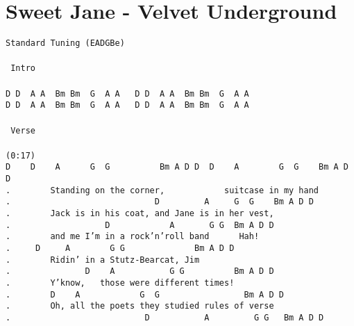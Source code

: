 \newpage
\section{Sweet Jane - Velvet Underground}
\label{Sweet Jane - Velvet Underground}
\texttt{Standard\ Tuning\ (EADGBe)\\
\\
\lbrack\ Intro\rbrack\\
\\
D\ D\ \ A\ A\ \ Bm\ Bm\ \ G\ \ A\ A\ \ \ D\ D\ \ A\ A\ \ Bm\ Bm\ \ G\ \ A\ A\\
D\ D\ \ A\ A\ \ Bm\ Bm\ \ G\ \ A\ A\ \ \ D\ D\ \ A\ A\ \ Bm\ Bm\ \ G\ \ A\ A\\
\\
\lbrack\ Verse\rbrack\\
\\
(0:17)\\
D\ \ \ \ D\ \ \ \ A\ \ \ \ \ \ G\ \ G\ \ \ \ \ \ \ \ \ \ Bm\ A\ D\ D\ \ D\ \ \ \ A\ \ \ \ \ \ \ \ G\ \ G\ \ \ \ Bm\ A\ D\ D\\
.\ \ \ \ \ \ \ \ Standing\ on\ the\ corner,\ \ \ \ \ \ \ \ \ \ \ \ suitcase\ in\ my\ hand\\
.\ \ \ \ \ \ \ \ \ \ \ \ \ \ \ \ \ \ \ \ \ \ \ \ \ \ \ \ \ D\ \ \ \ \ \ \ \ \ A\ \ \ \ \ G\ \ G\ \ \ \ Bm\ A\ D\ D\ \ \ \ \ \\
.\ \ \ \ \ \ \ \ Jack\ is\ in\ his\ coat,\ and\ Jane\ is\ in\ her\ vest,\ \ \ \ \ \ \ \\
.\ \ \ \ \ \ \ \ \ \ \ \ \ \ \ \ \ \ \ D\ \ \ \ \ \ \ \ \ \ \ \ A\ \ \ \ \ \ \ G\ G\ \ Bm\ A\ D\ D\\
.\ \ \ \ \ \ \ \ and\ me\ I'm\ in\ a\ rock'n'roll\ band\ \ \ \ \ \ Hah!\\
.\ \ \ \ \ D\ \ \ \ \ A\ \ \ \ \ \ \ \ G\ G\ \ \ \ \ \ \ \ \ \ \ \ \ \ Bm\ A\ D\ D\ \ \ \ \\
.\ \ \ \ \ \ \ \ Ridin'\ in\ a\ Stutz-Bearcat,\ Jim\\
.\ \ \ \ \ \ \ \ \ \ \ \ \ \ \ D\ \ \ \ A\ \ \ \ \ \ \ \ \ \ \ G\ G\ \ \ \ \ \ \ \ \ \ Bm\ A\ D\ D\\
.\ \ \ \ \ \ \ \ Y'know,\ \ \ those\ were\ different\ times!\\
.\ \ \ \ \ \ \ \ D\ \ \ \ A\ \ \ \ \ \ \ \ \ \ \ \ G\ \ G\ \ \ \ \ \ \ \ \ \ \ \ \ \ \ \ \ Bm\ A\ D\ D\\
.\ \ \ \ \ \ \ \ Oh,\ all\ the\ poets\ they\ studied\ rules\ of\ verse\\
.\ \ \ \ \ \ \ \ \ \ \ \ \ \ \ \ \ \ \ \ \ \ \ \ \ \ \ D\ \ \ \ \ \ \ \ \ \ \ A\ \ \ \ \ \ \ \ \ G\ G\ \ \ Bm\ A\ D\ D\\
}
